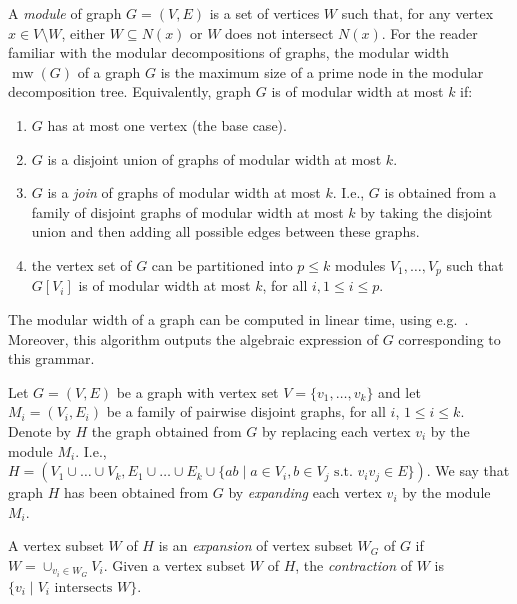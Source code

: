\documentclass{llncs}
\newcommand{\mw}{\operatorname{mw}}
\begin{document}
A \emph{module} of graph $G = (V,E)$ is a set of vertices $W$ such that, for any vertex $x \in V \setminus W$, either $W \subseteq N(x)$ or $W $ does not intersect $N(x)$. For the reader familiar with the modular decompositions of graphs, the modular width $\mw(G)$ of a graph $G$ is the maximum size of a prime node in the modular decomposition tree. Equivalently,
graph $G$ is of modular width at most $k$ if:
\begin{enumerate}
\item $G$ has at most one vertex (the base case).
\item $G$ is a disjoint union of graphs of modular width at most $k$.
\item $G$ is a \emph{join} of graphs of modular width at most $k$. I.e., $G$ is obtained from a family of disjoint graphs of modular width at most $k$ by taking the disjoint union and then adding all possible edges between these graphs.
\item the vertex set of $G$ can be partitioned into $p \leq k$ modules $V_1, \dots, V_p$ such that $G[V_i]$ is of modular width at most $k$, for all $i, 1 \leq i \leq p$.
\end{enumerate}
The modular width of a graph can be computed in linear time, using e.g.~\cite{TCHP08}. Moreover, this algorithm outputs the algebraic expression of $G$ corresponding to this grammar. 

Let $G=(V,E)$ be a graph with vertex set $V=\{v_1, \dots, v_k\}$ and let $M_i = (V_i,E_i)$ be a family of pairwise disjoint graphs, for all $i$, $1 \leq i \leq k$. Denote by $H$ the graph obtained from $G$ by replacing each vertex $v_i$ by the module $M_i$. I.e., $H=(V_1 \cup \dots \cup V_k, E_1 \cup \dots \cup E_k \cup \{ab \mid a \in V_i, b \in V_j \text{~s.t.~} v_iv_j \in E\})$. We say that graph $H$ has been obtained from $G$ by \emph{expanding} each vertex $v_i$ by the module $M_i$.

A vertex subset $W$ of $H$ is an \emph{expansion} of vertex subset $W_G$ of $G$ if $W = \cup_{v_i \in W_G} V_i$. Given a vertex subset $W$ of $H$, the \emph{contraction} of $W$ is $\{v_i \mid V_i \text{~intersects~} W\}$. 
\end{document}
